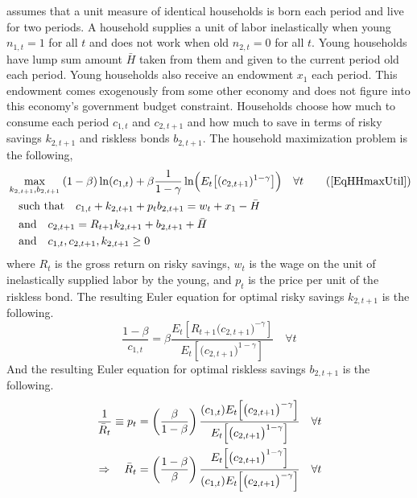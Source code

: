 \documentclass[letterpaper,12pt]{article}
\theoremstyle{definition}
\begin{document}
    \citet{Blanchard:2019} assumes that a unit measure of identical households is born each period and live for two periods. A household supplies a unit of labor inelastically when young $n_{1,t}=1$ for all $t$ and does not work when old $n_{2,t}=0$ for all $t$. Young households have lump sum amount $\bar{H}$ taken from them and given to the current period old each period. Young households also receive an endowment $x_1$ each period. This endowment comes exogenously from some other economy and does not figure into this economy's government budget constraint. Households choose how much to consume each period $c_{1,t}$ and $c_{2,t+1}$ and how much to save in terms of risky savings $k_{2,t+1}$ and riskless bonds $b_{2,t+1}$. The household maximization problem is the following,
    \begin{align}
      &\max_{k_{2,t+1},b_{2,t+1}}\: (1-\beta)\ln(c_{1,t}) + \beta\frac{1}{1-\gamma}\ln\Bigl(E_t\bigl[(c_{2,t+1})^{1-\gamma}\bigr]\Bigr) \quad \forall t \tag{\ref{EqHHmaxUtil}} \\
      &\quad\text{such that}\quad c_{1,t} + k_{2,t+1} + p_t b_{2,t+1} = w_t + x_1 - \bar{H} \label{EqTAppBlanch_bc1} \\
      &\quad\text{and}\quad c_{2,t+1} = R_{t+1}k_{2,t+1} + b_{2,t+1} + \bar{H} \label{EqTAppBlanch_bc2} \\
      &\quad\text{and}\quad c_{1,t},c_{2,t+1},k_{2,t+1} \geq 0 \label{EqModelRisk_nonneg}
    \end{align}
    where $R_t$ is the gross return on risky savings, $w_t$ is the wage on the unit of inelastically supplied labor by the young, and $p_t$ is the price per unit of the riskless bond. The resulting Euler equation for optimal risky savings $k_{2,t+1}$ is the following.
    \begin{equation}\label{EqTAppBlanch_Eul_c1}
      \frac{1-\beta}{c_{1,t}} = \beta \frac{E_t\left[R_{t+1}\bigl(c_{2,t+1}\bigr)^{-\gamma}\right]}{E_t\left[\bigl(c_{2,t+1}\bigr)^{1-\gamma}\right]} \quad\forall t
    \end{equation}
    And the resulting Euler equation for optimal riskless savings $b_{2,t+1}$ is the following.
    \begin{equation}\label{EqTAppBlanch_Eul_b2}
      \begin{split}
        \frac{1}{\bar{R}_t} \equiv p_t = \left(\frac{\beta}{1-\beta}\right)\frac{(c_{1,t})E_t\Bigl[\bigl(c_{2,t+1}\bigr)^{-\gamma}\Bigr]}{E_t\Bigl[\bigl(c_{2,t+1}\bigr)^{1-\gamma}\Bigr]} \quad \forall t \\
        \Rightarrow\quad \bar{R}_t = \left(\frac{1-\beta}{\beta}\right)\frac{E_t\Bigl[\bigl(c_{2,t+1}\bigr)^{1-\gamma}\Bigr]}{(c_{1,t})E_t\Bigl[\bigl(c_{2,t+1}\bigr)^{-\gamma}\Bigr]}\quad\forall t
      \end{split}
    \end{equation}
\end{document}
